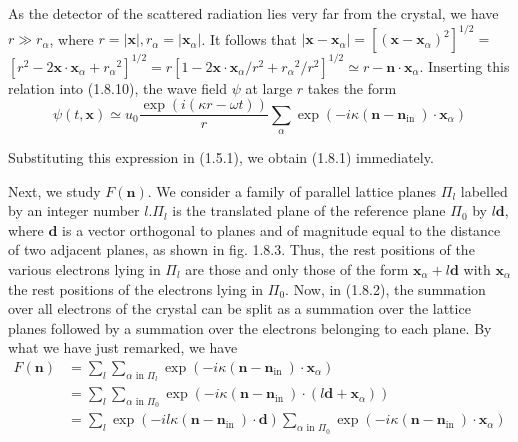 \documentclass{article}
\begin{document}
As the detector of the scattered radiation lies very far from the crystal, we have $r \gg r_{\alpha}$, where $r=|\boldsymbol{x}|, r_{\alpha}=\left|\boldsymbol{x}_{\alpha}\right|$. It follows that $\left|\boldsymbol{x}-\boldsymbol{x}_{\alpha}\right|=\left[\left(\boldsymbol{x}-\boldsymbol{x}_{\alpha}\right)^{2}\right]^{1 / 2}=$
$\left[r^{2}-2 \boldsymbol{x} \cdot \boldsymbol{x}_{\alpha}+r_{\alpha}{ }^{2}\right]^{1 / 2}=r\left[1-2 \boldsymbol{x} \cdot \boldsymbol{x}_{\alpha} / r^{2}+r_{\alpha}{ }^{2} / r^{2}\right]^{1 / 2} \simeq r-\boldsymbol{n} \cdot \boldsymbol{x}_{\alpha}$. Inserting this relation into (1.8.10), the wave field $\psi$ at large $r$ takes the form
$$
\begin{equation*}
\psi(t, \boldsymbol{x}) \simeq u_{0} \frac{\exp (i(\kappa r-\omega t))}{r} \sum_{\alpha} \exp \left(-i \kappa\left(\boldsymbol{n}-\boldsymbol{n}_{\text {in }}\right) \cdot \boldsymbol{x}_{\alpha}\right) \tag{1.8.11}
\end{equation*}
$$

Substituting this expression in (1.5.1), we obtain (1.8.1) immediately.

Next, we study $F(\boldsymbol{n})$. We consider a family of parallel lattice planes $\Pi_{l}$ labelled by an integer number $l . \Pi_{l}$ is the translated plane of the reference plane $\Pi_{0}$ by $l \boldsymbol{d}$, where $\boldsymbol{d}$ is a vector orthogonal to planes and of magnitude equal to the distance of two adjacent planes, as shown in fig. 1.8.3. Thus, the rest positions of the various electrons lying in $\Pi_{l}$ are those and only those of the form $\boldsymbol{x}_{\alpha}+l \boldsymbol{d}$ with $\boldsymbol{x}_{\alpha}$ the rest positions of the electrons lying in $\Pi_{0}$. Now, in (1.8.2), the summation over all electrons of the crystal can be split as a summation over the lattice planes followed by a summation over the electrons belonging to each plane. By what we have just remarked, we have
$$
\begin{align*}
F(\boldsymbol{n}) & =\sum_{l} \sum_{\alpha \text { in } \Pi_{l}} \exp \left(-i \kappa\left(\boldsymbol{n}-\boldsymbol{n}_{\text {in }}\right) \cdot \boldsymbol{x}_{\alpha}\right)  \tag{1.8.12}\\
& =\sum_{l} \sum_{\alpha \text { in } \Pi_{0}} \exp \left(-i \kappa\left(\boldsymbol{n}-\boldsymbol{n}_{\text {in }}\right) \cdot\left(l \boldsymbol{d}+\boldsymbol{x}_{\alpha}\right)\right) \\
& =\sum_{l} \exp \left(-i l \kappa\left(\boldsymbol{n}-\boldsymbol{n}_{\text {in }}\right) \cdot \boldsymbol{d}\right) \sum_{\alpha \text { in } \Pi_{0}} \exp \left(-i \kappa\left(\boldsymbol{n}-\boldsymbol{n}_{\text {in }}\right) \cdot \boldsymbol{x}_{\alpha}\right)
\end{align*}
$$
\end{document}
